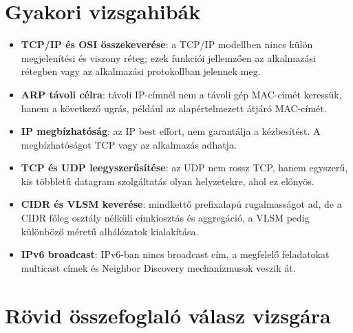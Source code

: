 \begin{center}

\end{center}



\section{Gyakori vizsgahibák}

\begin{warningbox}
\begin{itemize}
  \item \textbf{TCP/IP és OSI összekeverése}: a TCP/IP modellben nincs külön megjelenítési és viszony réteg; ezek funkciói jellemzően az alkalmazási rétegben vagy az alkalmazási protokollban jelennek meg.
  \item \textbf{ARP távoli célra}: távoli IP-címnél nem a távoli gép MAC-címét keressük, hanem a következő ugrás, például az alapértelmezett átjáró MAC-címét.
  \item \textbf{IP megbízhatóság}: az IP best effort, nem garantálja a kézbesítést. A megbízhatóságot TCP vagy az alkalmazás adhatja.
  \item \textbf{TCP és UDP leegyszerűsítése}: az UDP nem rossz TCP, hanem egyszerű, kis többletű datagram szolgáltatás olyan helyzetekre, ahol ez előnyös.
  \item \textbf{CIDR és VLSM keverése}: mindkettő prefixalapú rugalmasságot ad, de a CIDR főleg osztály nélküli címkiosztás és aggregáció, a VLSM pedig különböző méretű alhálózatok kialakítása.
  \item \textbf{IPv6 broadcast}: IPv6-ban nincs broadcast cím, a megfelelő feladatokat multicast címek és Neighbor Discovery mechanizmusok veszik át.
\end{itemize}
\end{warningbox}

\section{Rövid összefoglaló válasz vizsgára}

